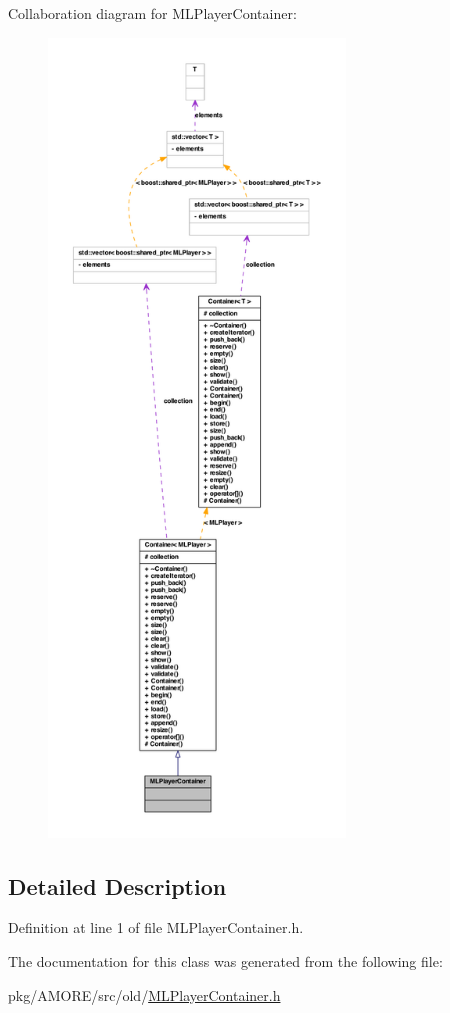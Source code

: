 Collaboration diagram for MLPlayerContainer:\nopagebreak
\begin{figure}[H]
\begin{center}
\leavevmode
\includegraphics[height=600pt]{class_m_l_player_container__coll__graph}
\end{center}
\end{figure}


\subsection{Detailed Description}


Definition at line 1 of file MLPlayerContainer.h.



The documentation for this class was generated from the following file:\begin{DoxyCompactItemize}
\item 
pkg/AMORE/src/old/\hyperlink{_m_l_player_container_8h}{MLPlayerContainer.h}\end{DoxyCompactItemize}
